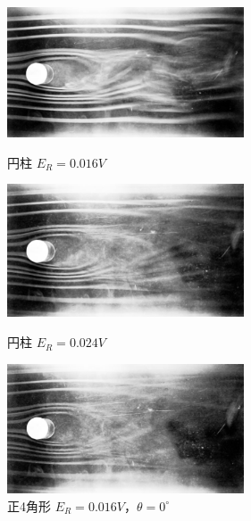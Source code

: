 \documentclass[twocolumn,10pt,a4j]{jsarticle}
\begin{document}
      \begin{figure}[htbp]
        \begin{minipage}{0.5\hsize}
          \begin{center}
            \includegraphics[width=7cm]{../img/kashika/001.jpg}
            \caption{円柱 $E_{R}=0.016V$}
          \end{center}
        \end{minipage}
        \begin{minipage}{0.5\hsize}
          \begin{center}
            \includegraphics[width=7cm]{../img/kashika/002.jpg}
            \caption{円柱 $E_{R}=0.024V$}
          \end{center}
        \end{minipage}
        \begin{minipage}{0.5\hsize}
          \begin{center}
            \includegraphics[width=7cm]{../img/kashika/003.jpg}
            \caption{正4角形 $E_{R}=0.016V， \theta=0^\circ$ }
          \end{center}
        \end{minipage}
      \end{figure}
\end{document}
